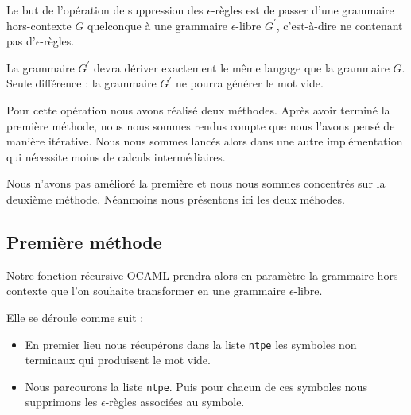 \documentclass[11pt,a4paper]{article}
\def\code#1{\texttt{#1}} %
\begin{document}
Le but de l'opération de suppression des $\epsilon$-règles
est de passer d'une grammaire hors-contexte $G$ quelconque
à une grammaire $\epsilon$-libre $G^\prime$, c'est-à-dire ne
contenant pas d'$\epsilon$-règles.

La grammaire $G^\prime$ devra dériver exactement le même
langage que la grammaire $G$. Seule différence : la grammaire
$G^\prime$ ne pourra générer le mot vide.

Pour cette opération nous avons réalisé deux méthodes. Après avoir
terminé la première méthode, nous nous sommes rendus compte que nous l'avons
pensé de manière itérative. Nous nous sommes lancés alors dans une autre
implémentation qui nécessite moins de calculs intermédiaires.

Nous n'avons pas amélioré la première et nous nous sommes concentrés sur
la deuxième méthode. Néanmoins nous présentons ici les deux méhodes.

\subsection{Première méthode}

Notre fonction récursive OCAML prendra alors en paramètre
la grammaire hors-contexte que l'on souhaite transformer
en une grammaire $\epsilon$-libre.

Elle se déroule comme suit :

\begin{itemize}
    \item En premier lieu nous récupérons dans la liste \code{ntpe}
    les symboles non terminaux qui produisent le mot vide.
    \item Nous parcourons la liste \code{ntpe}. Puis pour chacun de
    ces symboles nous supprimons les $\epsilon$-règles associées au symbole.
\end{itemize}
\end{document}
